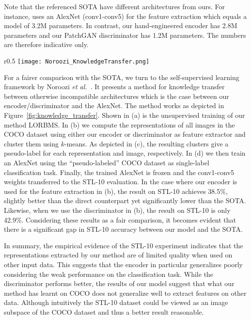 \documentclass[a4paper,12pt]{report}
\begin{document}
Note that the referenced SOTA have different architectures from ours. For instance, \cite{SpotArtifacts} uses an AlexNet (conv1-conv5) for the feature extraction which equals a model of 3.2M parameters. In contrast, our hand-engineered encoder has 2.8M parameters and our PatchGAN discriminator has 1.2M parameters. The numbers are therefore indicative only.

\begin{wrapfigure}{r}{0.5\textwidth}
\texttt{[image: Noroozi\_KnowledgeTransfer.png]} 
\caption[Knowledge transfer from our model to AlexNet.]{Knowledge transfer from the LORBMS model to the AlexNet model (adapted from \cite{KnowledgeTransfer}).} 
\label{fig:knowledge_transfer}
\end{wrapfigure}
For a fairer comparison with the SOTA, we turn to the self-supervised learning framework by Noroozi \textit{et al.}~\cite{KnowledgeTransfer}. It presents a method for knowledge transfer between otherwise incompatible architectures which is the case between our encoder/discriminator and the AlexNet. The method works as depicted in Figure~\ref{fig:knowledge_transfer}. Shown in (a) is the unsupervised training of our method LORBMS. In (b) we compute the representations of all images in the COCO dataset using either our encoder or discriminator as feature extractor and cluster them using $k$-means. As depicted in (c), the resulting clusters give a pseudo-label for each representation and image, respectively. In (d) we then train an AlexNet using the ``pseudo-labeled'' COCO dataset as single-label classification task. Finally, the trained AlexNet is frozen and the conv1-conv5 weights transferred to the STL-10 evaluation. In the case where our encoder is used for the feature extraction in (b), the result on STL-10 achieves 38.5\%, slightly better than the direct counterpart yet significantly lower than the SOTA. Likewise, when we use the discriminator in (b), the result on STL-10 is only 42.9\%. Considering these results as a fair comparison, it becomes evident that there is a significant gap in STL-10 accuracy between our model and the SOTA.

In summary, the empirical evidence of the STL-10 experiment indicates that the representations extracted by our method are of limited quality when used on other input data. This suggests that the encoder in particular generalizes poorly considering the weak performance on the classification task. While the discriminator performs better, the results of our model suggest that what our method has learnt on COCO does not generalize well to extract features on other data. Although intuitively the STL-10 dataset could be viewed as an image subspace of the COCO dataset and thus a better result reasonable.
\end{document}
